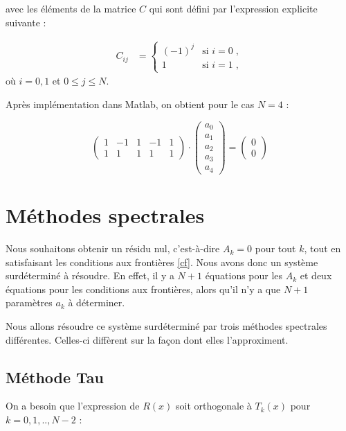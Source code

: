 \documentclass{report}
\begin{document}
avec les éléments de la matrice $C$ qui sont défini par l'expression explicite suivante :

\begin{align}
C_{ij} &= 
  \begin{cases}
    (-1)^{j} & \text{si $i=0$}\;,\\
1 & \text{si $i=1$}\;,
  \end{cases}
  \end{align}
où  $i= 0,1$ et $0 \leq j \leq N$.

Après implémentation dans Matlab, on obtient pour le cas $N=4$ :

\begin{equation}
\begin{pmatrix}
1 & -1 & 1 & -1 & 1\\ 
1 & 1 & 1 & 1 & 1
\end{pmatrix} \cdot \begin{pmatrix}
 a_0\\ 
 a_1\\ 
 a_2\\ 
 a_3\\ 
 a_4
\end{pmatrix}=\begin{pmatrix}
 0\\ 
 0
\end{pmatrix}
\end{equation}

\section{Méthodes spectrales}

Nous souhaitons obtenir un résidu nul, c'est-à-dire $A_{k}=0$ pour tout $k$, tout en satisfaisant les conditions aux frontières \eqref{cf}. Nous avons donc un système surdéterminé à résoudre. En effet, il y a $N+1$ équations pour les $A_{k}$ et deux équations pour les conditions aux frontières, alors qu'il n'y a que $N+1$ paramètres $a_{k}$ à déterminer.

Nous allons résoudre ce système surdéterminé par trois méthodes spectrales différentes. Celles-ci diffèrent sur la façon dont elles l'approximent. 

\subsection{Méthode Tau}

On a besoin que l'expression de $R(x)$ soit orthogonale à $T_k(x)$ pour $k=0,1,..,N-2$ :
\end{document}
